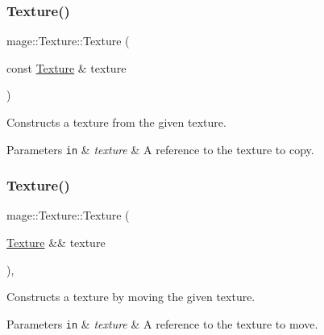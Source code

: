 \subsubsection{\texorpdfstring{Texture()}{Texture()}\hspace{0.1cm}{\footnotesize\ttfamily [5/6]}}
{\footnotesize\ttfamily mage\+::\+Texture\+::\+Texture (\begin{DoxyParamCaption}\item[{const \hyperlink{classmage_1_1_texture}{Texture} \&}]{texture }\end{DoxyParamCaption})\hspace{0.3cm}{\ttfamily [delete]}}

Constructs a texture from the given texture.


\begin{DoxyParams}[1]{Parameters}
\mbox{\tt in}  & {\em texture} & A reference to the texture to copy. \\
\hline
\end{DoxyParams}
\hypertarget{classmage_1_1_texture_a78a58499a8849c7dc163ed3fcb7a05cb}{}\label{classmage_1_1_texture_a78a58499a8849c7dc163ed3fcb7a05cb} 
\subsubsection{\texorpdfstring{Texture()}{Texture()}\hspace{0.1cm}{\footnotesize\ttfamily [6/6]}}
{\footnotesize\ttfamily mage\+::\+Texture\+::\+Texture (\begin{DoxyParamCaption}\item[{\hyperlink{classmage_1_1_texture}{Texture} \&\&}]{texture }\end{DoxyParamCaption})\hspace{0.3cm}{\ttfamily [default]}, {\ttfamily [noexcept]}}

Constructs a texture by moving the given texture.


\begin{DoxyParams}[1]{Parameters}
\mbox{\tt in}  & {\em texture} & A reference to the texture to move. \\
\hline
\end{DoxyParams}
\hypertarget{classmage_1_1_texture_a431f772cd37c75fd35f8f696c103238d}{}\label{classmage_1_1_texture_a431f772cd37c75fd35f8f696c103238d} 
